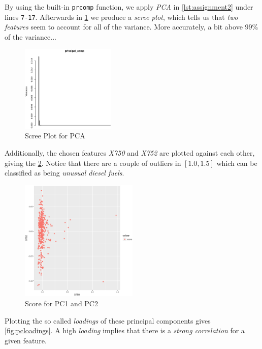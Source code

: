 \documentclass[a4paper, twocolumn]{article}
\begin{document}
        By using the built-in \verb|prcomp| function, we apply \emph{PCA} in \cref{lst:assignment2} under lines \verb|7-17|. Afterwards in \cref{fig:screeplot} we produce a \emph{scree plot}, which tells us that \emph{two features} seem to account for all of the variance. More accurately, a bit above \(99 \%\) of the variance...

        \begin{figure}[h!]
            \centering
            \caption{Scree Plot for PCA}
            \label{fig:screeplot}
            \includegraphics[width=0.4\textwidth]{share/screeplot.eps}
        \end{figure}

        Additionally, the chosen features \emph{X750} and \emph{X752} are plotted against each other, giving the \cref{fig:score}. Notice that there are a couple of outliers in \([1.0, 1.5]\) which can be classified as being \emph{unusual diesel fuels}.

        \begin{figure}[h!]
            \centering
            \caption{Score for PC1 and PC2}
            \label{fig:score}
            \includegraphics[width=0.5\textwidth]{share/score.eps}
        \end{figure}

        Plotting the so called \emph{loadings} of these principal components gives \cref{fig:pcloadings}. A high \emph{loading} implies that there is a \emph{strong correlation} for a given feature.
\end{document}
